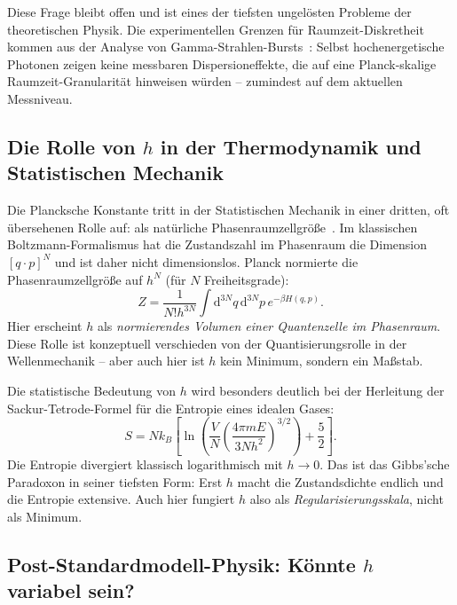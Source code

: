 ﻿\documentclass[12pt,a4paper]{article}
\theoremstyle{plain}
\theoremstyle{definition}
\theoremstyle{remark}
\begin{document}
Diese Frage bleibt offen und ist eines der tiefsten ungelösten Probleme der
theoretischen Physik. Die experimentellen Grenzen für Raumzeit-Diskretheit kommen aus
der Analyse von Gamma-Strahlen-Bursts~\cite{amelino2013}: Selbst hochenergetische Photonen
zeigen keine messbaren Dispersioneffekte, die auf eine Planck-skalige Raumzeit-Granularität
hinweisen würden -- zumindest auf dem aktuellen Messniveau.

\subsection{Die Rolle von $h$ in der Thermodynamik und Statistischen Mechanik}

Die Plancksche Konstante tritt in der Statistischen Mechanik in einer dritten, oft
übersehenen Rolle auf: als natürliche Phasenraumzellgröße~\cite{landau1980}. Im
klassischen Boltzmann-Formalismus hat die Zustandszahl im Phasenraum die Dimension
$[q \cdot p]^N$ und ist daher nicht dimensionslos. Planck normierte die Phasenraumzellgröße
auf $h^N$ (für $N$ Freiheitsgrade):
\begin{equation}
  Z = \frac{1}{N! h^{3N}} \int \mathrm{d}^{3N}q\,\mathrm{d}^{3N}p\,e^{-\beta H(q,p)}.
\end{equation}
Hier erscheint $h$ als \emph{normierendes Volumen einer Quantenzelle im Phasenraum}.
Diese Rolle ist konzeptuell verschieden von der Quantisierungsrolle in der
Wellenmechanik -- aber auch hier ist $h$ kein Minimum, sondern ein Maßstab.

Die statistische Bedeutung von $h$ wird besonders deutlich bei der Herleitung der
Sackur-Tetrode-Formel für die Entropie eines idealen Gases:
\begin{equation}
  S = Nk_B \left[\ln\!\left(\frac{V}{N}\left(\frac{4\pi m E}{3Nh^2}\right)^{3/2}\right) + \frac{5}{2}\right].
\end{equation}
Die Entropie divergiert klassisch logarithmisch mit $h \to 0$. Das ist das Gibbs'sche
Paradoxon in seiner tiefsten Form: Erst $h$ macht die Zustandsdichte endlich und die
Entropie extensive. Auch hier fungiert $h$ also als \emph{Regularisierungsskala}, nicht als Minimum.

\subsection{Post-Standardmodell-Physik: Könnte $h$ variabel sein?}
\end{document}
